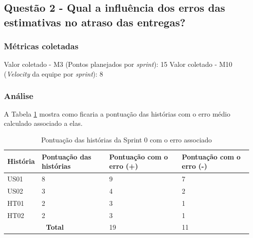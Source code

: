 \begin{apendicesenv}
	  \vfill
	  \pagebreak
	  \subsection*{Questão 2 - Qual a influência dos erros das estimativas no atraso das entregas?}
	    
	    \subsubsection*{Métricas coletadas}
	    
	      \subitem Valor coletado - M3 (Pontos planejados por \textit{sprint}): 15
	      \subitem Valor coletado - M10 (\textit{Velocity} da equipe por \textit{sprint}): 8
	    
	    \subsubsection*{Análise}
	      
	      A Tabela \ref{historias_erro} mostra como ficaria a pontuação das histórias com o erro médio calculado associado a elas.
	    
	      \begin{table}[h]
	      \centering
	      \caption{Pontuação das histórias da Sprint 0 com o erro associado}
	      \label{historias_erro}
	      \begin{tabular}{|l|l|l|l|}
	      \hline
	      \textbf{História} & \textbf{Pontuação das histórias} & \textbf{Pontuação com o erro (+)} & \textbf{Pontuação com o erro (-)} \\ \hline
	      US01              & 8                                & 9                                 & 7                                 \\ \hline
	      US02              & 3                                & 4                                 & 2                                 \\ \hline
	      HT01              & 2                                & 3                                 & 1                                 \\ \hline
	      HT02              & 2                                & 3                                 & 1                                 \\ \hline
	      \multicolumn{2}{|c|}{\textbf{Total}}                 & 19                                & 11                                \\ \hline
	      \end{tabular}
	      \end{table}
	      

\end{apendicesenv}
